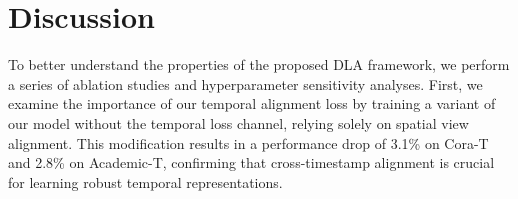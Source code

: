 \section{Discussion}
To better understand the properties of the proposed DLA framework, we perform a series of ablation studies and hyperparameter sensitivity analyses. First, we examine the importance of our temporal alignment loss by training a variant of our model without the temporal loss channel, relying solely on spatial view alignment. This modification results in a performance drop of 3.1\% on Cora-T and 2.8\% on Academic-T, confirming that cross-timestamp alignment is crucial for learning robust temporal representations.
